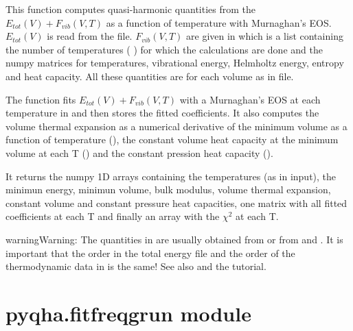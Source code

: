 \documentclass[letterpaper,10pt,english]{sphinxmanual}
\begin{document}
\begin{fulllineitems}
This function computes quasi-harmonic quantities from the 
\(E_{tot}(V)+F_{vib}(V,T)\) as a function of temperature with Murnaghan's
EOS. \(E_{tot}(V)\) is read from the  file. \(F_{vib}(V,T)\)
are given in  which is a list containing the number of temperatures
(  ) for which the calculations are done and the numpy matrices for 
temperatures, vibrational energy, Helmholtz energy, entropy and
heat capacity. All these quantities are for each volume as in  file.

The function fits \(E_{tot}(V)+F_{vib}(V,T)\) with a Murnaghan's EOS
at each temperature in  and then stores the fitted coefficients.
It also computes the volume thermal expansion as a numerical derivative of
the minimum volume as a function of temperature (), the
constant volume heat capacity at the minimum volume at each T
() and the constant pression heat capacity ().

It returns the numpy 1D arrays containing the temperatures (as in input), the
minimun energy, minimun volume, bulk modulus, volume thermal expansion, constant
volume and constant pressure heat capacities, one matrix with all fitted 
coefficients at each T and finally an array with the \(\chi^2\) at each T.

\begin{sphinxadmonition}{warning}{Warning:}
The quantities in  are usually obtained from 
or from  and . It is
important that the order in the total energy file  and the order of
the thermodynamic data in  is the same!  See also  and 
the tutorial.
\end{sphinxadmonition}

\end{fulllineitems}



\section{pyqha.fitfreqgrun module}
\label{pyqha:pyqha-fitfreqgrun-module}\label{pyqha:module-pyqha.fitfreqgrun}
\end{document}
